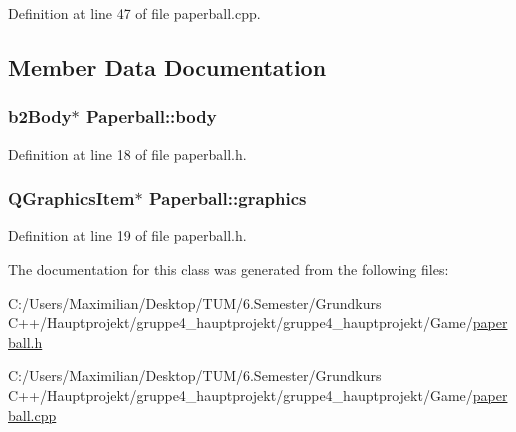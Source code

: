 Definition at line 47 of file paperball.\+cpp.



\subsection{Member Data Documentation}
\subsubsection[{\texorpdfstring{body}{body}}]{\setlength{\rightskip}{0pt plus 5cm}b2\+Body$\ast$ Paperball\+::body}\hypertarget{class_paperball_a5d5b3e0d4237ba80fe9590f49c88a0c0}{}\label{class_paperball_a5d5b3e0d4237ba80fe9590f49c88a0c0}


Definition at line 18 of file paperball.\+h.

\subsubsection[{\texorpdfstring{graphics}{graphics}}]{\setlength{\rightskip}{0pt plus 5cm}Q\+Graphics\+Item$\ast$ Paperball\+::graphics}\hypertarget{class_paperball_a87b4515e298699c840f541ee637215dd}{}\label{class_paperball_a87b4515e298699c840f541ee637215dd}


Definition at line 19 of file paperball.\+h.



The documentation for this class was generated from the following files\+:\begin{DoxyCompactItemize}
\item 
C\+:/\+Users/\+Maximilian/\+Desktop/\+T\+U\+M/6.\+Semester/\+Grundkurs C++/\+Hauptprojekt/gruppe4\+\_\+hauptprojekt/gruppe4\+\_\+hauptprojekt/\+Game/\hyperlink{paperball_8h}{paperball.\+h}\item 
C\+:/\+Users/\+Maximilian/\+Desktop/\+T\+U\+M/6.\+Semester/\+Grundkurs C++/\+Hauptprojekt/gruppe4\+\_\+hauptprojekt/gruppe4\+\_\+hauptprojekt/\+Game/\hyperlink{paperball_8cpp}{paperball.\+cpp}\end{DoxyCompactItemize}

